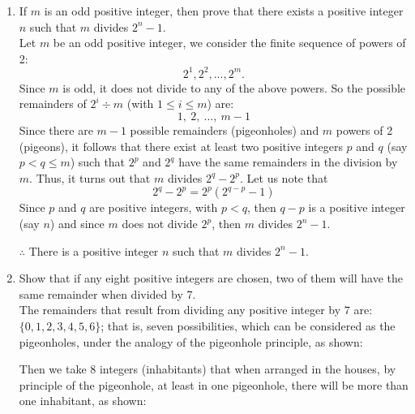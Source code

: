 \documentclass[letterpaper, 11pt]{article}	%
\begin{document}
\begin{enumerate}
	\item If $m$ is an odd positive integer, then prove that there exists a positive integer $n$ such that $m$ divides $2^n-1$.\\[5mm]
		Let $m$ be an odd positive integer, we consider the finite sequence of powers of 2:
		\begin{equation*}
			2^1,2^2,...,2^m.  
		\end{equation*}
		Since $m$ is odd, it does not divide to any of the above powers. So the possible remainders of $2^i\div m$ (with $1\leq i \leq m$) are:
		\begin{equation*}
			1,\ 2,\ ...,\ m-1 
		\end{equation*}
		Since there are $m-1$ possible remainders (pigeonholes) and $m$ powers of 2 (pigeons), it follows that there exist at least two positive integers $p$ and $q$ (say $p < q \leq m$) such that $2^p$ and $2^q$ have the same remainders in the division by $m$. Thus, it turns out that $m$ divides $2^q-2^p$. Let us note that
		\begin{equation*}
			2^q-2^p=2^p(2^{q-p}-1) 
		\end{equation*}
		Since $p$ and $q$ are positive integers, with $p < q$, then $q-p$ is a positive integer (say $n$) and since $m$ does not divide $2^p$, then $m$ divides $2^{n}-1$.
		
		$\therefore$ There is a positive integer $n$ such that $m$ divides $2^n-1$.\\[3cm]
	\item Show that if any eight positive integers are chosen, two of them will have the same remainder when divided by 7.\\[5mm]	
	The remainders that result from dividing any positive integer by $7$ are: $\{0, 1, 2, 3, 4, 5, 6\}$; that is, seven possibilities, which can be considered as the pigeonholes, under the analogy of the pigeonhole principle, as shown:
		\begin{center}
			\fbox{\textcolor{gray}{$0$}} \fbox{\textcolor{gray}{$1$}} \fbox{\textcolor{gray}{$2$}} \fbox{\textcolor{gray}{$3$}} \fbox{\textcolor{gray}{$4$}} \fbox{\textcolor{gray}{$5$}} \fbox{\textcolor{gray}{$6$}}
		\end{center}
		
		Then we take 8 integers (inhabitants) that when arranged in the houses, by principle of the pigeonhole, at least in one pigeonhole, there will be more than one inhabitant, as shown:
		\begin{center}
\end{center}
\end{enumerate}
\end{document}
